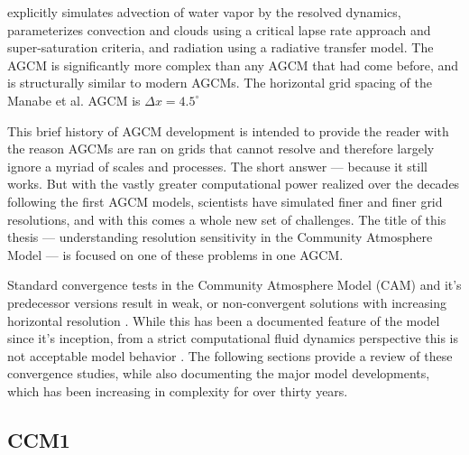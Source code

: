 \cite{METAL1965MWR} explicitly simulates advection of water vapor by the resolved dynamics, parameterizes convection and clouds using a critical lapse rate approach and super-saturation criteria, and radiation using a radiative transfer model. The \cite{METAL1965MWR} AGCM is significantly more complex than any AGCM that had come before, and is structurally similar to modern AGCMs. The horizontal grid spacing of the Manabe et al. AGCM is $\Delta x = 4.5^{\circ}$

This brief history of AGCM development is intended to provide the reader with the reason AGCMs are ran on grids that cannot resolve and therefore largely ignore a myriad of scales and processes. The short answer --- because it still works. But with the vastly greater computational power realized over the decades following the first AGCM models, scientists have simulated finer and finer grid resolutions, and with this comes a whole new set of challenges. The title of this thesis --- understanding resolution sensitivity in the Community Atmosphere Model --- is focused on one of these problems in one AGCM. 

Standard convergence tests in the Community Atmosphere Model (CAM) and it's predecessor versions result in weak, or non-convergent solutions with increasing horizontal resolution \citep{KW1991JGR,WETAL1995CD,W1999T,W2008TELLUS,LETAL2011TELLUS,RJ2011MWR,RETAL2012ASL,OETAL2013JCLIM,RETAL2013JCLIM,ZetAl2014JCb,LETAL2015JCLIM}. While this has been a documented feature of the model since it's inception, from a strict computational fluid dynamics perspective this is not acceptable model behavior \citep{W2008TELLUS}. The following sections provide a review of these convergence studies, while also documenting the major model developments, which has been increasing in complexity for over thirty years.

\subsection{CCM1}

